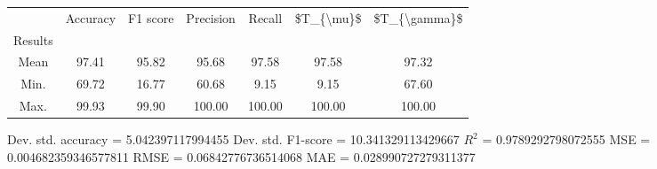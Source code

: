 \begin{tabular}{|c|c|c|c|c|c|c|}
\toprule
{} &  Accuracy &  F1 score &  Precision &  Recall &  \$T\_\{\textbackslash mu\}\$ &  \$T\_\{\textbackslash gamma\}\$ \\
Results &           &           &            &         &            &               \\
\hline
Mean    &     97.41 &     95.82 &      95.68 &   97.58 &      97.58 &         97.32 \\
Min.    &     69.72 &     16.77 &      60.68 &    9.15 &       9.15 &         67.60 \\
Max.    &     99.93 &     99.90 &     100.00 &  100.00 &     100.00 &        100.00 \\
\bottomrule
\end{tabular}

 Dev. std. accuracy = 5.042397117994455
 Dev. std. F1-score = 10.341329113429667
 $R^2$ = 0.9789292798072555
 MSE = 0.004682359346577811
 RMSE = 0.06842776736514068
 MAE = 0.028990727279311377